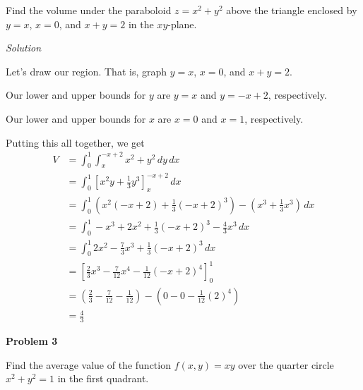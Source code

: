 \documentclass{article}
\newcommand{\lrp}[1]{\left( #1 \right)}
\newcommand{\lrb}[1]{\left[ #1 \right]}
\newcommand{\Solution}{\textit{Solution}}
\begin{document}
Find the volume under the paraboloid $z = x^2 +y^2$ above the triangle enclosed by $y = x$,
$x = 0$, and $x + y = 2$ in the $xy$-plane.

\Solution

Let's draw our region. That is, graph $y=x$, $x=0$, and $x+y=2$.
\begin{center}
\end{center}

Our lower and upper bounds for $y$ are $y=x$ and $y=-x+2$, respectively.

Our lower and upper bounds for $x$ are $x=0$ and $x=1$, respectively.

Putting this all together, we get
\begin{align*}
    V&=\int_0^1\int_{x}^{-x+2} x^2+y^2\,dy\,dx\\
    &=\int_0^1 \lrb{x^2y+\frac{1}{3}y^3}_{x}^{-x+2}\,dx\\
    &=\int_0^1 \lrp{x^2(-x+2)+\frac{1}{3}(-x+2)^3}-\lrp{x^3+\frac{1}{3}x^3}\,dx\\
    &= \int_0^1 -x^3 + 2x^2 +\frac{1}{3}(-x+2)^3 -\frac{4}{3}x^3\,dx\\
    &=\int_0^1 2x^2 -\frac{7}{3}x^3 +\frac{1}{3}(-x+2)^3\,dx\\
    &=\lrb{\frac{2}{3}x^3-\frac{7}{12}x^4-\frac{1}{12}(-x+2)^4}_0^1\\
    &=\lrp{\frac{2}{3}-\frac{7}{12}-\frac{1}{12}}-\lrp{0-0-\frac{1}{12}(2)^4}\\
    &=\boxed{\frac{4}{3}}\tag{use a calculator :)}
\end{align*}
{}\textbf{Problem 3}

Find the average value of the function $f(x,y) = xy$ over the quarter circle $x^2 + y^2 = 1$
in the first quadrant.
\end{document}
